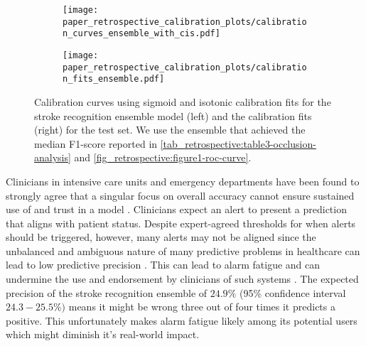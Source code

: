 \begin{figure}
    \begin{subfigure}[c]{0.48\columnwidth}
        \centering
        \texttt{[image: paper\_retrospective\_calibration\_plots/calibration\_curves\_ensemble\_with\_cis.pdf]}
    \end{subfigure}    
    \begin{subfigure}[c]{0.48\columnwidth}
        \centering
        \texttt{[image: paper\_retrospective\_calibration\_plots/calibration\_fits\_ensemble.pdf]}
    \end{subfigure}    
    \caption[Calibration fits and curves for the stroke recognition ensemble using Platt-scaling and isotonic regression for calibration.]{ Calibration curves using sigmoid and isotonic calibration fits for the stroke recognition ensemble model (left) and the calibration fits (right) for the test set. We use the ensemble that achieved the median F1-score reported in \cref{tab_retrospective:table3-occlusion-analysis} and \cref{fig_retrospective:figure1-roc-curve}.}
    \label{fig_discussion:retrospective-paper-calibration-curve-sigmoid-isotonic}
\end{figure}    

Clinicians in intensive care units and emergency departments have been found to strongly agree that a singular focus on overall accuracy cannot ensure sustained use of and trust in a model \cite{tonekaboni_what_2019}. Clinicians expect an alert to present a prediction that aligns with patient status. Despite expert-agreed thresholds for when alerts should be triggered, however, many alerts may not be aligned since the unbalanced and ambiguous nature of many predictive problems in healthcare can lead to low predictive precision \parencite{umscheid_development_2015, cite14, cite15, wenstrup_retrospective_2023}. This can lead to alarm fatigue \parencite{embi_evaluating_2012} and can undermine the use and endorsement by clinicians of such systems \parencite{guidi_clinician_2015}. 
The expected precision of the stroke recognition ensemble of $24.9\%$ (95\% confidence interval $24.3-25.5\%)$ means it might be wrong three out of four times it predicts a positive. This unfortunately makes alarm fatigue likely among its potential users which might diminish it's real-world impact.

